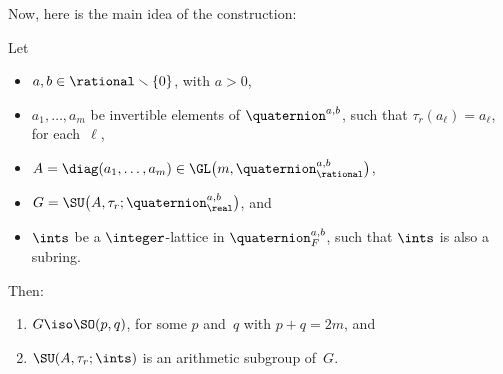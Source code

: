 Now, here is the main idea of the construction:
 
 \begin{prop} \label{SU(H_Q)}
  Let 
  \noprelistbreak
  	\begin{itemize}
	\item $a,b \in \rational \smallsetminus \{0\}$, with $a > 0$,
	\item $a_1,\ldots,a_m$ be invertible elements of\/ $\quaternion^{a,b}$, such that $\tau_r(a_\ell) = a_\ell$, for each~$\ell$,
	\item $A = \diag(a_1,\ldots,a_m) \in \GL \bigl( m , \quaternion^{a,b}_\rational \bigr)$,
 \item $G = \SU \bigl( A, \tau_r; \quaternion^{a,b}_\real \bigr)$,
and
 \item $\ints$ be a $\integer$-lattice in
$\quaternion^{a,b}_F$, such that $\ints$ is also a
subring.
 \end{itemize}
 Then:
 \begin{enumerate}
 \item \label{SU(H_Q)-SO}
 $G \iso \SO(p,q)$, for some $p$ and~$q$ with $p + q = 2m$,
 and
 \item  \label{SU(H_Q)-arith}
$\SU ( A, \tau_r; \ints)$ is an arithmetic subgroup of~$G$.
 \end{enumerate}
\end{prop}

